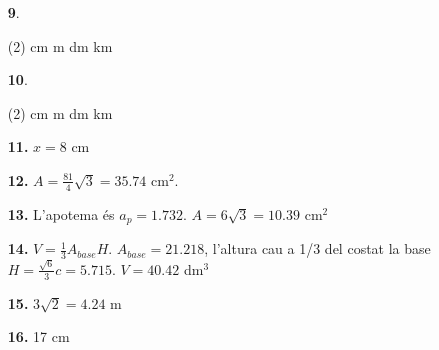 \documentclass[a4paper, pdf, twoside]{book}
\begin{document}
\begin{multicols}{2}
\begin{enumerate}
 \item[\fontfamily{phv}\selectfont\color{blue}\textbf{9}. ] 
 \begin{tasks}[column-sep=1em, item-indent=1.3333em](2)
	  cm
	  m
	  dm
	  km
\end{tasks}
 \end{enumerate}
\begin{enumerate}
\vspace{0.25cm}



 \item[\fontfamily{phv}\selectfont\color{blue}\textbf{10}. ] 
 \begin{tasks}[column-sep=1em, item-indent=1.3333em](2)
	  cm
	  m
	  dm
	  km
\end{tasks}
\vspace{0.25cm}
\item[\fontfamily{phv}\selectfont\color{blue}\textbf{11. }]  \scalebox{0.6}{\simbolclau } 
$x=8$ cm
\vspace{0.25cm}
\item[\fontfamily{phv}\selectfont\color{blue}\textbf{12. }] 
$A=\frac {81}{4}\sqrt {3}=35.74$ cm$^2$.
\vspace{0.25cm}
\item[\fontfamily{phv}\selectfont\color{blue}\textbf{13. }] 
L'apotema és $a_p=1.732$. $A=6\sqrt {3}=10.39$ cm$^2$
\vspace{0.25cm}
\item[\fontfamily{phv}\selectfont\color{blue}\textbf{14. }] 
$V=\frac {1}{3}A_{base}H$. $A_{base}=21.218$, l'altura cau a 1/3 del costat la base $H=\frac {\sqrt {6}}{3}c=5.715$. $V=40.42$ dm$^3$
\vspace{0.25cm}
\item[\fontfamily{phv}\selectfont\color{blue}\textbf{15. }] 
$3\sqrt {2}=4.24$ m
\vspace{0.25cm}
\item[\fontfamily{phv}\selectfont\color{blue}\textbf{16. }] 
17 cm
\vspace{0.25cm}




\end{enumerate}
\end{multicols}
\end{document}

